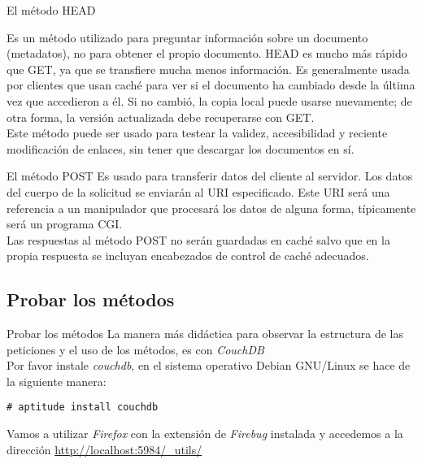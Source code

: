 \begin{frame}{El método HEAD} %

Es un método utilizado para preguntar información sobre un documento
(metadatos), no para obtener el propio documento. HEAD es mucho más rápido que
GET, ya que se transfiere mucha menos información. Es generalmente usada por
clientes que usan caché para ver si el documento ha cambiado desde la última
vez que accedieron a él. Si no cambió, la copia local puede usarse nuevamente;
de otra forma, la versión actualizada debe recuperarse con GET.  \\[0.5cm]

Este método puede ser usado para testear la validez, accesibilidad y reciente modificación de enlaces, sin tener que descargar los documentos en sí. 

\end{frame}

\begin{frame}{El método POST} %
Es usado para transferir datos del cliente al servidor. Los datos del cuerpo de
la solicitud se enviarán al URI especificado. Este URI será una referencia a un
manipulador que procesará los datos de alguna forma, típicamente será un
programa CGI. \\[0.5cm]

Las respuestas al método POST no serán guardadas en caché salvo que en la propia respuesta se incluyan encabezados de control de caché adecuados.
\end{frame}


\subsection{Probar los métodos} %

\begin{frame}[fragile]{Probar los métodos} %
    La manera más didáctica para observar la estructura de las peticiones y el
    uso de los métodos, es con \textit{CouchDB}\\[0.5cm]

    Por favor instale \textit{couchdb}, en el sistema operativo Debian
    GNU/Linux se hace de la siguiente manera: 

    \begin{verbatim}
# aptitude install couchdb
    \end{verbatim}

    Vamos a utilizar \textit{Firefox} con la extensión de \textit{Firebug}
    instalada y accedemos a la dirección
    \url{http://localhost:5984/\_utils/}

\end{frame}


